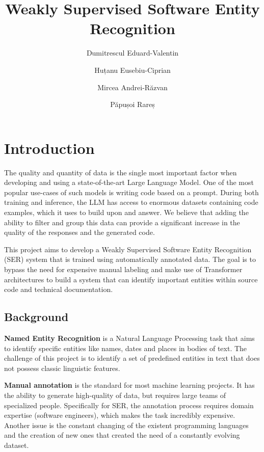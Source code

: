 \documentclass{article}
\title{Weakly Supervised Software Entity Recognition}
\author[1]{Dumitrescul Eduard-Valentin}
\author[2]{Huțanu Eusebiu-Ciprian}
\author[3]{Mircea Andrei-Răzvan}
\author[4]{Păpușoi Rareș}
\affil{University of Bucharest}
\begin{document}
\maketitle

\begin{abstract}

\end{abstract}


\section{Introduction}
The quality and quantity of data is the single most important factor when 
developing and using a state-of-the-art Large Language Model. One of the most 
popular use-cases of such models is writing code based on a prompt. During 
both training and inference, the LLM has access to enormous datasets containing
code examples, which it uses to build upon and answer. We believe that adding 
the ability to filter and group this data can provide a significant increase in 
the quality of the responses and the generated code.

This project aims to develop a Weakly Supervised Software Entity Recognition (SER)
system that is trained using automatically annotated data. The goal is to bypass
the need for expensive manual labeling and make use of Transformer architectures
to build a system that can identify important entities within source code and 
technical documentation.

\subsection{Background}
\textbf{Named Entity Recognition} is a Natural Language Processing task that 
aims to identify specific entities \textemdash like names, dates and places 
\textemdash in bodies of text. The challenge of this project is to identify a 
set of predefined entities in text that does not possess classic linguistic 
features.

\textbf{Manual annotation} is the standard for most machine learning projects.
It has the ability to generate high-quality of data, but requires
large teams of specialized people. Specifically for SER, the annotation process
requires domain expertise (software engineers), which makes the task incredibly
expensive. Another issue is the constant changing of the existent programming 
languages and the creation of new ones that created the need of a constantly 
evolving dataset.
\end{document}
